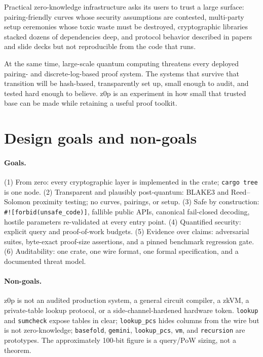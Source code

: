 \documentclass[11pt,a4paper]{article}
\begin{document}
Practical zero-knowledge infrastructure asks its users to trust a large
surface: pairing-friendly curves whose security assumptions are contested,
multi-party setup ceremonies whose toxic waste must be destroyed,
cryptographic libraries stacked dozens of dependencies deep, and protocol
behavior described in papers and slide decks but not reproducible from the
code that runs.

At the same time, large-scale quantum computing threatens every deployed
pairing- and discrete-log-based proof system. The systems that survive that
transition will be hash-based, transparently set up, small enough to audit,
and tested hard enough to believe. z0p is an experiment in how small that
trusted base can be made while retaining a useful proof toolkit.

\section{Design goals and non-goals}

\paragraph{Goals.} (1) From zero: every cryptographic layer is implemented in
the crate; \texttt{cargo tree} is one node. (2) Transparent and plausibly
post-quantum: BLAKE3 and Reed--Solomon proximity testing; no curves, pairings,
or setup. (3) Safe by construction: \texttt{\#![forbid(unsafe\_code)]},
fallible public APIs, canonical fail-closed decoding, hostile parameters
re-validated at every entry point. (4) Quantified security: explicit query and
proof-of-work budgets. (5) Evidence over claims: adversarial suites,
byte-exact proof-size assertions, and a pinned benchmark regression gate.
(6) Auditability: one crate, one wire format, one formal specification, and a
documented threat model.

\paragraph{Non-goals.} z0p is not an audited production system, a general
circuit compiler, a zkVM, a private-table lookup protocol, or a
side-channel-hardened hardware token. \texttt{lookup} and \texttt{sumcheck}
expose tables in clear; \texttt{lookup\_pcs} hides columns from the wire but
is not zero-knowledge; \texttt{basefold}, \texttt{gemini},
\texttt{lookup\_pcs}, \texttt{vm}, and \texttt{recursion} are prototypes.
The approximately 100-bit figure is a query/PoW sizing, not a theorem.
\end{document}
